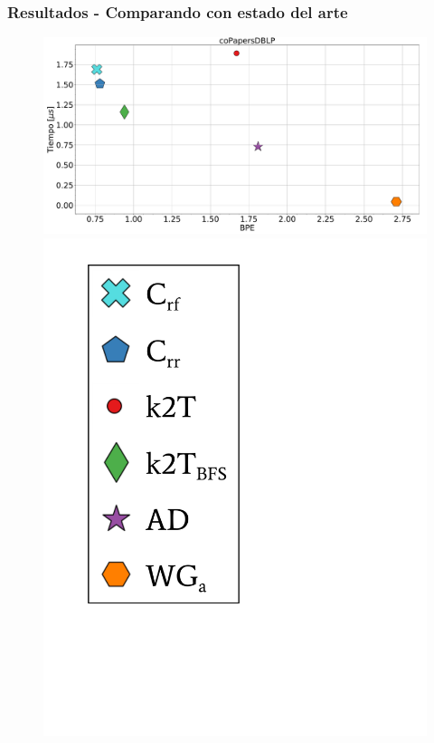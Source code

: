 \begin{frame}
\frametitle{Resultados - Comparando con estado del arte}

\begin{figure}
	\centering
	
    	\begin{minipage}{1\textwidth}
    		\centering
    		\begin{minipage}{0.8\textwidth}
    			\centering
    			\includegraphics[width=1\linewidth]{../img/bpeTimes/aleatorio/coPapersDBLP.pdf}
    		\end{minipage}
    		\begin{minipage}{0.15\textwidth}
    			\centering
    			\includegraphics[scale=.16, clip, trim=70 200 280 40]{../img/bpeTimes/labelAle.pdf}
    		\end{minipage}	
    	\end{minipage}


\end{figure}
\end{frame}
